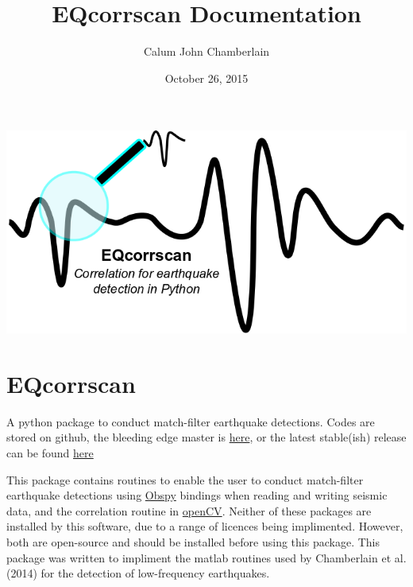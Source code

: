 \documentclass[a4paper,10pt,english]{sphinxmanual}
\title{EQcorrscan Documentation}
\date{October 26, 2015}
\author{Calum John Chamberlain}
\begin{document}
\maketitle
\tableofcontents
{}\label{index::doc}

\href{https://github.com/calum-chamberlain/EQcorrscan/releases}{\includegraphics{EQcorrscan_logo.png}}

\chapter{EQcorrscan}
\label{index:eqcorrscan}\label{index:welcome-to-eqcorrscan-s-documentation}
A python package to conduct match-filter earthquake detections.  Codes are stored
on github, the bleeding edge master is \href{https://github.com/calum-chamberlain/EQcorrscan}{here}, or the latest stable(ish) release
can be found \href{https://github.com/calum-chamberlain/EQcorrscan/releases}{here}

This package contains routines to enable the user to conduct match-filter earthquake
detections using \href{https://github.com/obspy/obspy/wiki}{Obspy} bindings when reading
and writing seismic data, and the correlation routine in \href{http://opencv.org/}{openCV}.
Neither of these packages are installed by this software, due to a range of
licences being implimented.  However, both are open-source and should be installed
before using this package.  This package was written to impliment the matlab routines
used by Chamberlain et al. (2014) for the detection of low-frequency earthquakes.
\end{document}
